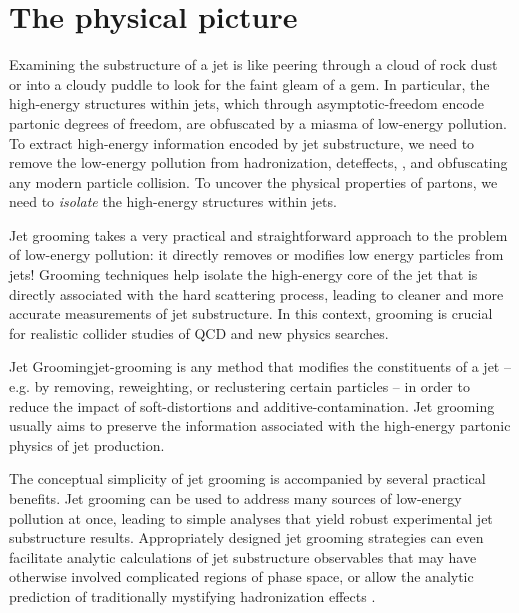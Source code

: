\section{The physical picture}

Examining the substructure of a jet is like peering through a cloud of rock dust or into a cloudy puddle to look for the faint gleam of a gem.
%
In particular, the high-energy structures within jets, which through \gls{asymptotic-freedom} encode partonic degrees of freedom, are obfuscated by a miasma of low-energy pollution.
%
To extract high-energy information encoded by jet substructure, we need to remove the low-energy pollution from \gls{hadronization}, \gls{deteffects}, , and  obfuscating any modern particle collision.
%
To uncover the physical properties of partons, we need to \textit{isolate} the high-energy structures within jets.


Jet grooming takes a very practical and straightforward approach to the problem of low-energy pollution:
%
it directly removes or modifies low energy particles from jets!
%
Grooming techniques help isolate the high-energy core of the jet that is directly associated with the hard scattering process, leading to cleaner and more accurate measurements of jet substructure.
%
In this context, grooming is crucial for realistic collider studies of QCD and new physics searches.

\begin{definitionbox}{Jet Grooming}{jet-grooming}
     is any method that modifies the constituents of a jet -- e.g. by removing, reweighting, or reclustering certain particles -- in order to reduce the impact of \glspl{soft-distortion} and \gls{additive-contamination}.
    Jet grooming usually aims to preserve the information associated with the high-energy partonic physics of jet production.
\end{definitionbox}

The conceptual simplicity of jet grooming is accompanied by several practical benefits.
%
Jet grooming can be used to address many sources of low-energy pollution at once, leading to simple analyses that yield robust experimental jet substructure results.
%
Appropriately designed jet grooming strategies can even facilitate analytic calculations of jet substructure observables that may have otherwise involved complicated regions of phase space, or allow the analytic prediction of traditionally mystifying \gls{hadronization} effects \cite{}.


